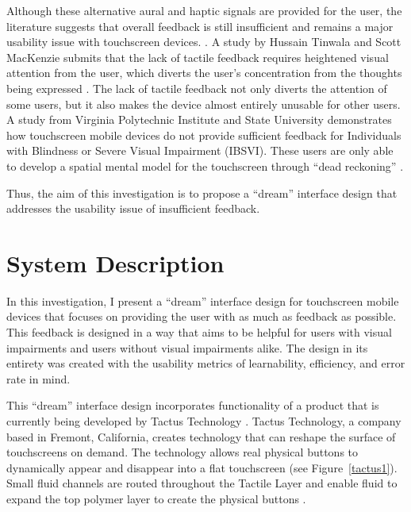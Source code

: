 \documentclass[11pt]{article}
\begin{document}
Although these alternative aural and haptic signals are provided for the user, the literature suggests that overall feedback is still insufficient and remains a major usability issue with touchscreen devices. \cite{Tinwala:2010:ETE:18	68914.1868972, Kane:2011:UGB:1978942.1979001, Hardy:2008:TIT:1409240.1409267, El-Glaly:2013:TTF:2460625.2460665, Buxton:1986:HID:22339.22386}. A study by Hussain Tinwala and Scott MacKenzie submits that the lack of tactile feedback requires heightened visual attention from the user, which diverts the user's concentration from the thoughts being expressed \cite{Tinwala:2010:ETE:18 68914.1868972}. The lack of tactile feedback not only diverts the attention of some users, but it also makes the device  almost entirely unusable for other users. A study from Virginia Polytechnic Institute and State University demonstrates how touchscreen mobile devices do not provide sufficient feedback for Individuals with Blindness or Severe Visual Impairment (IBSVI). These users are only able to develop a spatial mental model for the touchscreen through ``dead reckoning'' \cite{El-Glaly:2013:TTF:2460625.2460665}. 

Thus, the aim of this investigation is to propose a ``dream'' interface design that addresses the usability issue of insufficient feedback.


\section{System Description}
\label{System Description}

In this investigation, I present a ``dream'' interface design for touchscreen mobile devices that focuses on providing the user with as much as feedback as possible. This feedback is designed in a way that aims to be helpful for users with visual impairments and users without visual impairments alike. The design in its entirety was created with the usability metrics of learnability, efficiency, and error rate in mind.

This ``dream'' interface design incorporates functionality of a product that is currently being developed by Tactus Technology \cite{Tactus}. Tactus Technology, a company based in Fremont, California, creates technology that can reshape the surface of touchscreens on demand. The technology allows real physical buttons to dynamically appear and disappear into a flat touchscreen (see Figure~\ref{tactus1}). Small fluid channels are routed throughout the Tactile Layer and enable fluid to expand the top polymer layer to create the physical buttons \cite{Tactus}.
\end{document}
